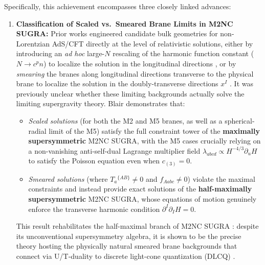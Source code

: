 \documentclass[11pt]{article}
\begin{document}
Specifically, this achievement encompasses three closely linked advances:
\begin{enumerate}
    \item \textbf{Classification of Scaled vs.\ Smeared Brane Limits in M2NC SUGRA:} Prior works engineered candidate bulk geometries for non-Lorentzian AdS/CFT directly at the level of relativistic solutions, either by introducing an \emph{ad hoc} large-$N$ rescaling of the harmonic function constant ($N \to c^p n$) to localize the solution in the longitudinal directions \cite{Lambert:2024uue,Fontanella:2024rvn,Fontanella:2024kyl}, or by \emph{smearing} the branes along longitudinal directions transverse to the physical brane to localize the solution in the doubly-transverse directions $x^I$ \cite{Blair:2024aqz,Lambert:2024ncn,Harmark:2025ikv}. It was previously unclear whether these limiting backgrounds actually solve the limiting supergravity theory. Blair demonstrates that:
    \begin{itemize}
        \item \emph{Scaled solutions} (for both the M2 and M5 branes, as well as a spherical-radial limit of the M5) satisfy the full constraint tower of the \textbf{maximally supersymmetric} M2NC SUGRA, with the M5 cases crucially relying on a non-vanishing anti-self-dual Lagrange multiplier field $\lambda_{abcd} \propto H^{-4/3}\partial_u H$ to satisfy the Poisson equation even when $c_{(3)}=0$.
        \item \emph{Smeared solutions} (where $T_a{}^{\{AB\}} \neq 0$ and $f_{Aabc} \neq 0$) violate the maximal constraints and instead provide exact solutions of the \textbf{half-maximally supersymmetric} M2NC SUGRA, whose equations of motion genuinely enforce the transverse harmonic condition $\partial^I \partial_I H = 0$.
    \end{itemize}
    This result rehabilitates the half-maximal branch of M2NC SUGRA \cite{Bergshoeff:2024nin}: despite its unconventional supersymmetry algebra, it is shown to be the precise theory hosting the physically natural smeared brane backgrounds that connect via U/T-duality to discrete light-cone quantization (DLCQ) \cite{Blair:2024aqz,Harmark:2025ikv}.


\end{enumerate}
\end{document}
